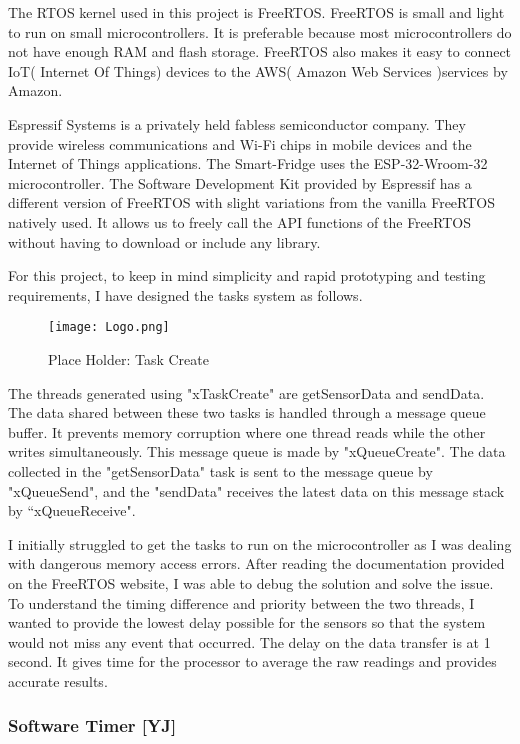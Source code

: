 The RTOS kernel used in this project is FreeRTOS.
FreeRTOS is small and light to run on small microcontrollers.
It is preferable because most microcontrollers do not have enough RAM and flash storage.
FreeRTOS also makes it easy to connect IoT( Internet Of Things) devices to the AWS( Amazon Web Services )services by Amazon.

Espressif Systems is a privately held fabless semiconductor company.
They provide wireless communications and Wi-Fi chips in mobile devices and the Internet of Things applications.
The Smart-Fridge uses the ESP-32-Wroom-32 microcontroller.
The Software Development Kit provided by Espressif has a different version of FreeRTOS with slight variations from the vanilla FreeRTOS natively used.
It allows us to freely call the API functions of the FreeRTOS without having to download or include any library.

For this project, to keep in mind simplicity and rapid prototyping and testing requirements, I have designed the tasks system as follows.

\begin{figure}[H]        
    \centering
    \texttt{[image: Logo.png]}
    \caption{Place Holder: Task Create}
    \label{fig:placeholder}
\end{figure} 

The threads generated using "xTaskCreate" are getSensorData and sendData.
The data shared between these two tasks is handled through a message queue buffer.
It prevents memory corruption where one thread reads while the other writes simultaneously.
This message queue is made by "xQueueCreate".
The data collected in the "getSensorData" task is sent to the message queue by "xQueueSend", and the "sendData" receives the latest data on this message stack by “xQueueReceive".

I initially struggled to get the tasks to run on the microcontroller as I was dealing with dangerous memory access errors.
After reading the documentation provided on the FreeRTOS website, I was able to debug the solution and solve the issue.
To understand the timing difference and priority between the two threads, I wanted to provide the lowest delay possible for the sensors so that the system would not miss any event that occurred.
The delay on the data transfer is at 1 second.
It gives time for the processor to average the raw readings and provides accurate results.

\subsubsection{Software Timer [YJ]}

